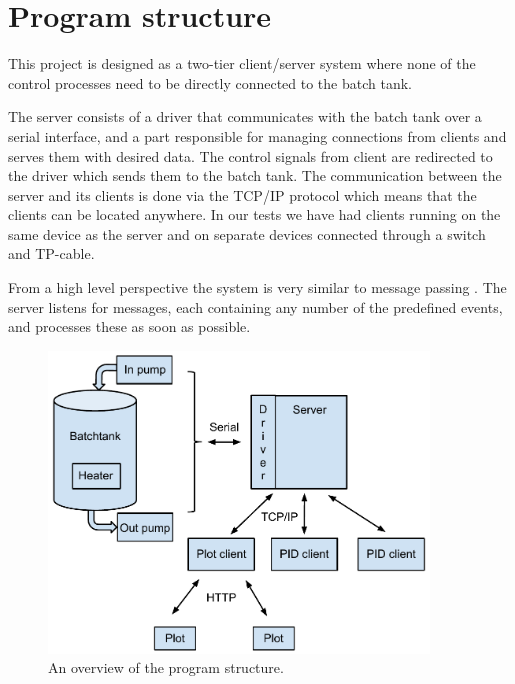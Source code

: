 \documentclass{article}
\begin{document}
\section{Program structure}
This project is designed as a two-tier client/server system 
\cite[p.~6]{clientserver} where none of the control processes need to be directly
connected to the batch tank.

The server consists of a driver that communicates with the batch tank over a
serial interface, and a part responsible for managing connections from
clients and serves them with desired data. The control signals from client are redirected to the driver which sends them to the batch tank. The communication
between the server and its clients is done via the TCP/IP protocol which means
that the clients can be located anywhere. In our tests we have had clients
running on the same device as the server and on separate devices connected
through a switch and TP-cable.

From a high level perspective the system is very similar to message
passing \cite[p.~71]{rtcs}. The server listens for messages, each
containing any number of the predefined events, and processes these as
soon as possible.

\begin{figure}[H]
\includegraphics[width=0.9\textwidth]{systemoverview.pdf}
\caption{An overview of the program structure.}
\label{fig:system overview}
\end{figure}
\end{document}
